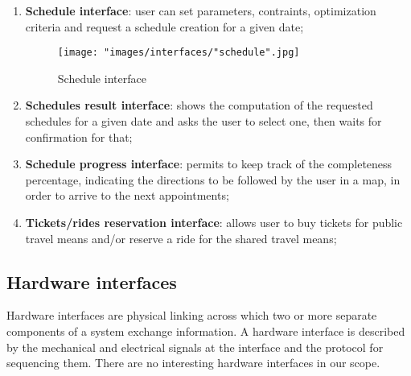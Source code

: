 \begin{enumerate}
\begin{figure}[H]
\end{figure}
\item \textbf{Schedule interface}: user can set parameters, contraints, optimization criteria and request a schedule creation for a given date;
\begin{figure}[H]
\begin{center}
\texttt{[image: "images/interfaces/"schedule".jpg]}
\caption{Schedule interface}
\end{center}
\end{figure}
\item \textbf{Schedules result interface}: shows the computation of the requested schedules for a given date and asks the user to select one, then waits for confirmation for that;
\item \textbf{Schedule progress interface}: permits to keep track of the completeness percentage, indicating the directions to be followed by the user in a map, in order to arrive to the next appointments;
\item \textbf{Tickets/rides reservation interface}: allows user to buy tickets for public travel means and/or reserve a ride for the shared travel means;
\end{enumerate}

\subsection{Hardware interfaces}
Hardware interfaces are physical linking across which two or more separate components of a system exchange information. A hardware interface is described by the mechanical and electrical signals at the interface and the protocol for sequencing them. There are no interesting hardware interfaces in our scope.

